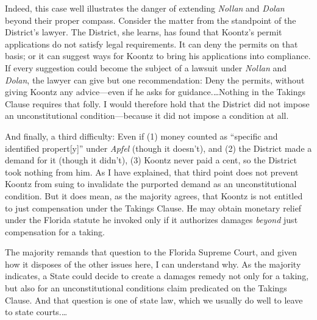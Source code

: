 Indeed, this case well illustrates the danger of extending \textit{Nollan} and
\textit{Dolan} beyond their proper compass. Consider the matter from the
standpoint of the District's lawyer. The District, she learns, has found that
Koontz's permit applications do not satisfy legal requirements. It can deny the
permits on that basis; or it can suggest ways for Koontz to bring his
applications into compliance. If every suggestion could become the subject of a
lawsuit under \textit{Nollan} and \textit{Dolan}, the lawyer can give but one
recommendation: Deny the permits, without giving Koontz any advice---even if he
asks for guidance.\ldots Nothing in the Takings Clause requires that folly. I
would therefore hold that the District did not impose an unconstitutional
condition---because it did not impose a condition at all.



And finally, a third difficulty: Even if (1) money counted as ``specific and
identified propert[y]'' under \textit{Apfel} (though it doesn't), and (2) the
District made a demand for it (though it didn't), (3) Koontz never paid a cent,
so the District took nothing from him. As I have explained, that third point
does not prevent Koontz from suing to invalidate the purported demand as an
unconstitutional condition. But it does mean, as the majority agrees, that
Koontz is not entitled to just compensation under the Takings Clause. He may
obtain monetary relief under the Florida statute he invoked only if it
authorizes damages \textit{beyond} just compensation for a taking.

The majority remands that question to the Florida Supreme Court, and given how
it disposes of the other issues here, I can understand why. As the majority
indicates, a State could decide to create a damages remedy not only for a
taking, but also for an unconstitutional conditions claim predicated on the
Takings Clause. And that question is one of state law, which we usually do well
to leave to state courts.\ldots



